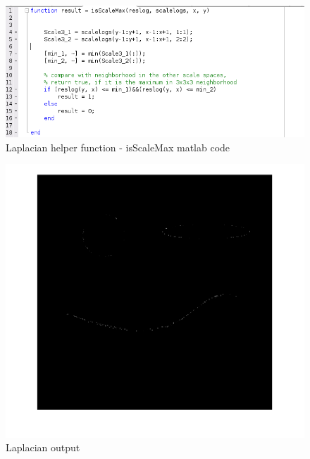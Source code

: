 \documentclass[]{article}
\begin{document}
\begin{figure}[h!]
\centering
\includegraphics[width=1.35\textwidth]{img/1c3-code.png}
\caption{Laplacian helper function - isScaleMax matlab code}
\end{figure}

\begin{figure}[h!]
\centering
\includegraphics[width=1.35\textwidth]{img/1c-output.png}
\caption{Laplacian output}
\end{figure}
\end{document}
